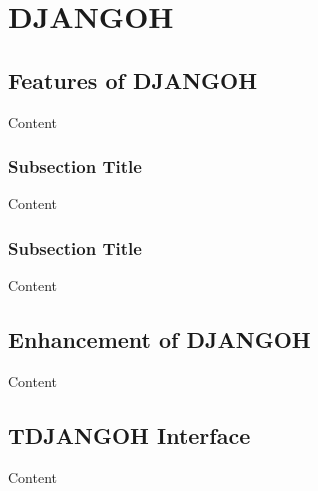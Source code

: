 
\chapter{DJANGOH} %

\label{ch:DJANGOH} %


\section{Features of DJANGOH}

Content


\subsection{Subsection Title}

Content


\subsection{Subsection Title}

Content


\section{Enhancement of DJANGOH}

Content


\section{TDJANGOH Interface}

Content
